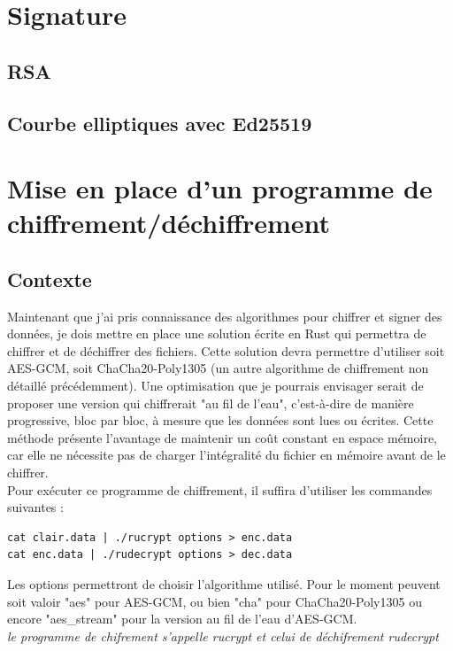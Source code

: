 \documentclass[a4paper, 12pt]{article}
\begin{document}
\section{Signature}
\subsection{RSA}
\subsection{Courbe elliptiques avec Ed25519}

\section{Mise en place d'un programme de chiffrement/déchiffrement}
\subsection{Contexte}
Maintenant que j'ai pris connaissance des algorithmes pour chiffrer et signer des données, je dois mettre en place une solution écrite en Rust qui permettra de chiffrer et de déchiffrer des fichiers. Cette solution devra permettre d'utiliser soit AES-GCM, soit ChaCha20-Poly1305 (un autre algorithme de chiffrement non détaillé précédemment).
Une optimisation que je pourrais envisager serait de proposer une version qui chiffrerait "au fil de l'eau", c'est-à-dire de manière progressive, bloc par bloc, à mesure que les données sont lues ou écrites. Cette méthode présente l'avantage de maintenir un coût constant en espace mémoire, car elle ne nécessite pas de charger l'intégralité du fichier en mémoire avant de le chiffrer. \\


Pour exécuter ce programme de chiffrement, il suffira d'utiliser les commandes suivantes :
\begin{verbatim}
cat clair.data | ./rucrypt options > enc.data
cat enc.data | ./rudecrypt options > dec.data
\end{verbatim}
Les options permettront de choisir l'algorithme utilisé. Pour le moment peuvent soit valoir "aes" pour AES-GCM, ou bien "cha" pour ChaCha20-Poly1305 ou encore "aes\_stream" pour la version au fil de l'eau d'AES-GCM.\\


\noindent\emph{le programme de chifrement s'appelle rucrypt et celui de déchifrement rudecrypt}
\end{document}
